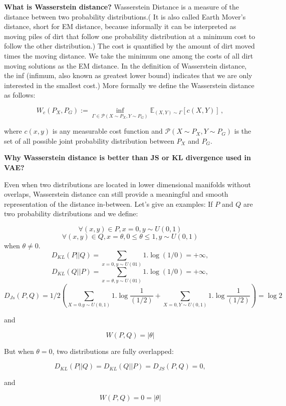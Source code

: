 \documentclass[12pt,english]{amsart}
\begin{document}
\textbf{What is Wasserstein distance?}
Wasserstein Distance is a measure of the distance between two probability
distributions.( It is also called Earth Mover's distance, short for EM distance,
because informally it can be interpreted as moving piles of dirt that follow one
probability distribution at a minimum cost to follow the other distribution.)
The cost is quantified by the amount of dirt moved times the moving distance. We
take the minimum one among the costs of all dirt moving solutions as the EM
distance. In the definition of Wasserstein distance, the inf (infimum, also
known as greatest lower bound) indicates that we are only interested in the
smallest cost.) More formally we define the Wasserstein distance as follows:

\begin{equation}
\label{eq:ot}
W_c(P_X,P_G):=\inf_{\Gamma\in \mathcal{P}(X\sim P_X,Y\sim P_G)} \mathbb{E}_{(X,Y)\sim\Gamma}[c(X,Y)]\,,
\end{equation}

where $c(x,y)$ is any measurable cost function and
$\mathcal{P}(X\sim P_X,Y\sim P_G)$ is the set of all possible joint probability
distribution between $P_X$ and $P_G$.

\textbf{Why Wasserstein distance is better than JS or KL divergence used in VAE?}

Even when two distributions are located in lower dimensional manifolds without
overlaps, Wasserstein distance can still provide a meaningful and smooth
representation of the distance in-between. Let's give an examples: If $P$ and
$Q$ are two probability distributions and we define:

$$\forall (x,y) \in P, x=0 , y\sim U(0,1)$$
$$\forall (x,y) \in Q, x=\theta, 0\leq \theta \leq 1, y\sim U(0,1)$$
when $\theta \not=0$.\\
$$D_{KL}(P||Q)= \sum _{x=0, y \sim U(01)} 1. \log(1/0)= +\infty,$$
$$D_{KL}(Q||P)= \sum _{x=\theta, y \sim U(01)} 1. \log(1/0)= +\infty,$$
$$D_{Js} (P,Q)= 1/2 \left( \sum_{X=0. y \sim U(0,1)}1. \log \frac{1}{(1/2)}+ \sum_{X=0, Y\sim U(0,1)}1. \log \frac{1}{(1/2)}\right)= \log 2$$

and

$$W(P,Q)= |\theta|$$

But when $\theta=0$, two distributions are fully overlapped:

$$D_{KL}(P||Q)= D_{KL}(Q||P)= D_{JS}(P,Q)=0,$$

and

$$W(P,Q)=0=|\theta|$$
\end{document}

